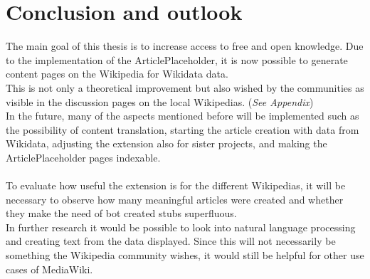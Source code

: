 \chapter{Conclusion and outlook}

The main goal of this thesis is to increase access to free and open knowledge. Due to the implementation of the ArticlePlaceholder, it is now possible to generate content pages on the Wikipedia for Wikidata data. \\
This is not only a theoretical improvement but also wished by the communities as visible in the discussion pages on the local Wikipedias. (\textit{See Appendix}) \\
In the future, many of the aspects mentioned before will be implemented such as the possibility of content translation, starting the article creation with data from Wikidata, adjusting the extension also for sister projects, and making the ArticlePlaceholder pages indexable. \\
\\
To evaluate how useful the extension is for the different Wikipedias, it will be necessary to observe how many meaningful articles were created and whether they make the need of bot created stubs superfluous. \\
In further research it would be possible to look into natural language processing and creating text from the data displayed. Since this will not necessarily be something the Wikipedia community wishes, it would still be helpful for other use cases of MediaWiki. 